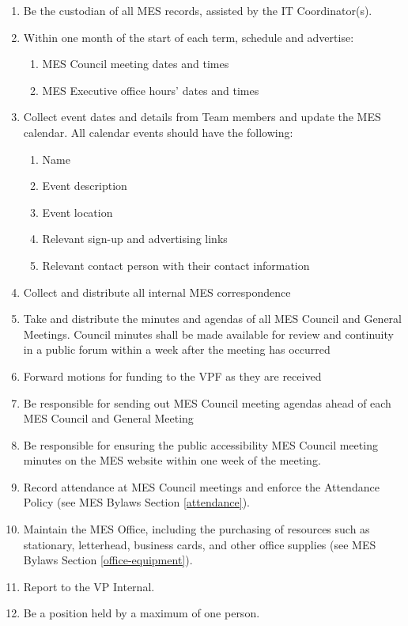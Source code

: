 \begin{enumerate}
 \item
  Be the custodian of all MES records, assisted by the IT Coordinator(s).
 \item
  Within one month of the start of each term, schedule and advertise:

  \begin{enumerate}
   \item
    MES Council meeting dates and times
   \item
    MES Executive office hours' dates and times
  \end{enumerate}
 \item
  Collect event dates and details from Team members and update the MES calendar. All calendar events should have the following:

  \begin{enumerate}
   \item
    Name
   \item
    Event description
   \item
    Event location
   \item
    Relevant sign-up and advertising links
   \item
    Relevant contact person with their contact information
  \end{enumerate}
 \item
  Collect and distribute all internal MES correspondence
 \item
  Take and distribute the minutes and agendas of all MES Council and General Meetings. Council minutes shall be made available for review and continuity in a public forum within a week after the meeting has occurred
 \item
  Forward motions for funding to the VPF as they are received
 \item
  Be responsible for sending out MES Council meeting agendas ahead of each MES Council and General Meeting
 \item
  Be responsible for ensuring the public accessibility MES Council meeting minutes on the MES website within one week of the meeting.
 \item
  Record attendance at MES Council meetings and enforce the Attendance Policy (see MES Bylaws Section \ref{attendance}).
 \item
  Maintain the MES Office, including the purchasing of resources such as stationary, letterhead, business cards, and other office supplies (see MES Bylaws Section \ref{office-equipment}).
 \item
  Report to the VP Internal.
 \item
  Be a position held by a maximum of one person.

\end{enumerate}

